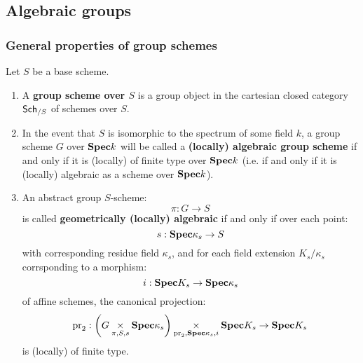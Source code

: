         \subsection{Algebraic groups} \label{subsubsection: algebraic_groups}
            \subsubsection{General properties of group schemes}
                \begin{definition} \label{def: algebraic_groups} 
                    Let $S$ be a base scheme.
                    \begin{enumerate}
                        \item A \textbf{group scheme over $S$} is a group object in the cartesian closed category $\mathsf{Sch}_{/S}$ of schemes over $S$. 
                        \item In the event that $S$ is isomorphic to the spectrum of some field $k$, a group scheme $G$ over $\mathbf{Spec} k$ will be called a \textbf{(locally) algebraic group scheme} if and only if it is (locally) of finite type over $\mathbf{Spec} k$ (i.e. if and only if it is (locally) algebraic as a scheme over $\mathbf{Spec} k$).
                        \item An abstract group $S$-scheme:
                            $$\pi: G \to S$$
                        is called \textbf{geometrically (locally) algebraic} if and only if over each point:
                            $$s: \mathbf{Spec} \kappa_s \to S$$
                        with corresponding residue field $\kappa_s$, and for each field extension $K_s/\kappa_s$ corrsponding to a morphism:
                            $$i: \mathbf{Spec} K_s \to \mathbf{Spec} \kappa_s$$
                        of affine schemes, the canonical projection:
                            $$\pr_2: \left(G \x_{\pi, S, s} \Spec \kappa_s\right) \x_{\pr_2, \Spec \kappa_s, i} \Spec K_s \to \Spec K_s$$
                        is (locally) of finite type.
                    \end{enumerate}
                \end{definition}
